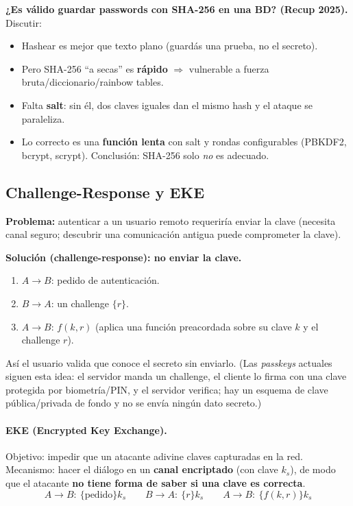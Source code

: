 \documentclass[../main.tex]{subfiles}
\begin{document}
\begin{examen}
\textbf{¿Es válido guardar passwords con SHA-256 en una BD? (Recup 2025).} Discutir:
\begin{itemize}[itemsep=1pt]
  \item Hashear es mejor que texto plano (guardás una prueba, no el secreto).
  \item Pero SHA-256 ``a secas'' es \textbf{rápido} $\Rightarrow$ vulnerable a fuerza bruta/diccionario/rainbow tables.
  \item Falta \textbf{salt}: sin él, dos claves iguales dan el mismo hash y el ataque se paraleliza.
  \item Lo correcto es una \textbf{función lenta} con salt y rondas configurables (PBKDF2, bcrypt, scrypt). Conclusión: SHA-256 solo \emph{no} es adecuado.
\end{itemize}
\end{examen}

\subsection{Challenge-Response y EKE}

\textbf{Problema:} autenticar a un usuario remoto requeriría enviar la clave (necesita canal seguro; descubrir una comunicación antigua puede comprometer la clave).

\textbf{Solución (challenge-response): no enviar la clave.}
\begin{enumerate}[itemsep=1pt]
  \item $A \to B$: pedido de autenticación.
  \item $B \to A$: un challenge $\{r\}$.
  \item $A \to B$: $f(k,r)$ (aplica una función preacordada sobre su clave $k$ y el challenge $r$).
\end{enumerate}
Así el usuario valida que conoce el secreto sin enviarlo. (Las \emph{passkeys} actuales siguen esta idea: el servidor manda un challenge, el cliente lo firma con una clave protegida por biometría/PIN, y el servidor verifica; hay un esquema de clave pública/privada de fondo y no se envía ningún dato secreto.)

\paragraph{EKE (Encrypted Key Exchange).} Objetivo: impedir que un atacante adivine claves capturadas en la red. Mecanismo: hacer el diálogo en un \textbf{canal encriptado} (con clave $k_s$), de modo que el atacante \textbf{no tiene forma de saber si una clave es correcta}.
$$A\to B:\ \{\text{pedido}\}k_s \qquad B\to A:\ \{r\}k_s \qquad A\to B:\ \{f(k,r)\}k_s$$
\end{document}
